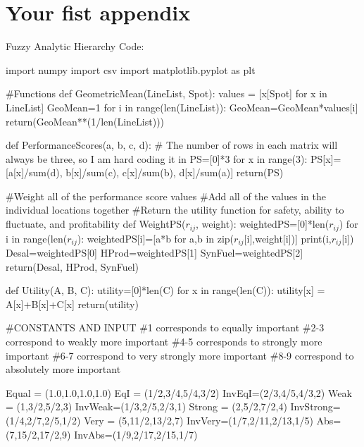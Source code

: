 \documentclass[12pt]{UIdahoMastersThesis}
\begin{document}




\clearpage
\appendix  %

\chapter{Your fist appendix}
Fuzzy Analytic Hierarchy Code:

import numpy
import csv
import matplotlib.pyplot as plt

\#Functions
def GeometricMean(LineList, Spot):
    values = [x[Spot] for x in LineList]
    GeoMean=1
    for i in range(len(LineList)):
        GeoMean=GeoMean*values[i]
    return(GeoMean**(1/len(LineList)))

def PerformanceScores(a, b, c, d):
    \# The number of rows in each matrix will always be three, so I am hard coding it in
    PS=[0]*3
    for x in range(3):
        PS[x]=[a[x]/sum(d), b[x]/sum(c), c[x]/sum(b), d[x]/sum(a)]
    return(PS)

\#Weight all of the performance score values
\#Add all of the values in the individual locations together
\#Return the utility function for safety, ability to fluctuate, and profitability
def WeightPS($r_{ij}$, weight):
    weightedPS=[0]*len($r_{ij}$)
    for i in range(len($r_{ij}$):
        weightedPS[i]=[a*b for a,b in zip($r_{ij}$[i],weight[i])]
        print(i,$r_{ij}$[i])
    Desal=weightedPS[0]
    HProd=weightedPS[1]
    SynFuel=weightedPS[2]
    return(Desal, HProd, SynFuel)

def Utility(A, B, C):
    utility=[0]*len(C)
    for x in range(len(C)):
        utility[x] = A[x]+B[x]+C[x]
    return(utility)




\#CONSTANTS AND INPUT
\#1 corresponds to equally important
\#2-3 correspond to weakly more important
\#4-5 corresponds to strongly more important
\#6-7 correspond to very strongly more important
\#8-9 correspond to absolutely more important

Equal = (1.0,1.0,1.0,1.0)
EqI = (1/2,3/4,5/4,3/2)
InvEqI=(2/3,4/5,4/3,2)
Weak = (1,3/2,5/2,3)
InvWeak=(1/3,2/5,2/3,1)
Strong = (2,5/2,7/2,4)
InvStrong=(1/4,2/7,2/5,1/2)
Very = (5,11/2,13/2,7)
InvVery=(1/7,2/11,2/13,1/5)
Abs=(7,15/2,17/2,9)
InvAbs=(1/9,2/17,2/15,1/7)
\end{document}
